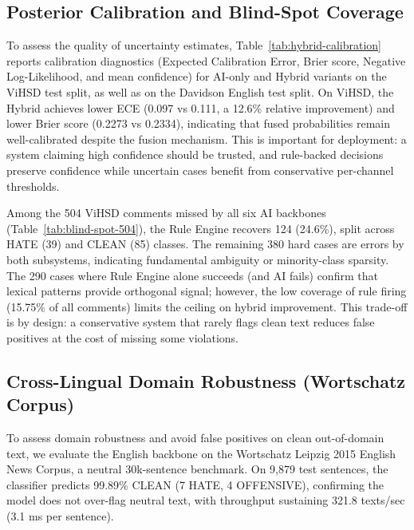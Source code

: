 \subsection{Posterior Calibration and Blind-Spot Coverage}
\label{sec:calibration_blindspot}

To assess the quality of uncertainty estimates, Table~\ref{tab:hybrid-calibration}
reports calibration diagnostics (Expected Calibration Error, Brier score,
Negative Log-Likelihood, and mean confidence) for AI-only and Hybrid variants on
the ViHSD test split, as well as on the Davidson English test split.
On ViHSD, the Hybrid achieves lower ECE (0.097 vs 0.111, a 12.6\% relative improvement)
and lower Brier score (0.2273 vs 0.2334), indicating that fused probabilities remain well-calibrated
despite the fusion mechanism.  This is important for deployment: a system claiming
high confidence should be trusted, and rule-backed decisions preserve confidence
while uncertain cases benefit from conservative per-channel thresholds.

Among the 504 ViHSD comments missed by all six AI backbones (Table~\ref{tab:blind-spot-504}),
the Rule Engine recovers 124 (24.6\%), split across HATE (39) and CLEAN (85) classes.
The remaining 380 hard cases are errors by both subsystems, indicating fundamental
ambiguity or minority-class sparsity.  The 290 cases where Rule Engine alone succeeds
(and AI fails) confirm that lexical patterns provide orthogonal signal; however, the
low coverage of rule firing (15.75\% of all comments) limits the ceiling on hybrid
improvement.  This trade-off is by design: a conservative system that rarely flags
clean text reduces false positives at the cost of missing some violations.





\subsection{Cross-Lingual Domain Robustness (Wortschatz Corpus)}
\label{sec:crosslingual_wortschatz}

To assess domain robustness and avoid false positives on clean out-of-domain text,
we evaluate the English backbone on the Wortschatz Leipzig
2015 English News Corpus, a neutral 30k-sentence benchmark. On 9,879 test sentences,
the classifier predicts 99.89\% CLEAN (7 HATE, 4 OFFENSIVE), confirming the model does
not over-flag neutral text, with throughput sustaining 321.8 texts/sec (3.1 ms per sentence).